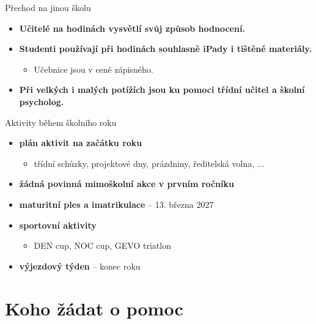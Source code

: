 \documentclass[
		czech,
		sections numbered,
		xcolor=dvipsnames,
		aspectratio=169,
]{beamer}
\begin{document}
\begin{frame}{Přechod na jinou školu}
		\begin{itemize}
				\item \textbf<1>{Učitelé na hodinách vysvětlí svůj způsob hodnocení.}
						\pause
				\item \textbf<2>{Studenti používají při hodinách souhlasně iPady i tištěné
						materiály.}
						\begin{itemize}
								\item Učebnice jsou v ceně zápisného.
						\end{itemize}
						\pause
				\item \textbf<3>{Při velkých i malých potížích jsou ku pomoci třídní učitel
						a školní psycholog.}
		\end{itemize}
\end{frame}

\begin{frame}{Aktivity během školního roku}
		\begin{itemize}
				\item \textbf<1>{plán aktivit na začátku roku}
						\begin{itemize}
								\item třídní schůzky, projektové dny, prázdniny, ředitelská volna, ...
						\end{itemize}
						\pause
				\item \textbf<2>{žádná povinná mimoškolní akce v prvním ročníku}
						\pause
				\item \textbf<3>{maturitní ples a imatrikulace} -- 13. března 2027
						\pause
				\item \textbf<4>{sportovní aktivity}
						\begin{itemize}
								\item DEN cup, NOC cup, GEVO triatlon
						\end{itemize}
						\pause
				\item \textbf<5>{výjezdový týden} -- konec roku
		\end{itemize}
\end{frame}

\section{Koho žádat o pomoc}
\label{sec:koho-zadat-o-pomoc}
\end{document}
